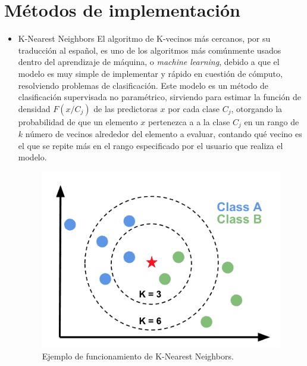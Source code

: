 \documentclass[spanish,12pt,letterpaper]{article}
\begin{document}
\section{Métodos de implementación}
\begin{itemize}
    \item K-Nearest Neighbors
    El algoritmo de K-vecinos más cercanos, por su traducción al español, es uno de los algoritmos más comúnmente usados dentro del aprendizaje de máquina, o \textit{machine learning}, debido a que el modelo es muy simple de implementar y rápido en cuestión de cómputo, resolviendo problemas de clasificación. Este modelo es un método de clasificación supervisada no paramétrico, sirviendo para estimar la función de densidad $F(x/C_j)$ de las predictoras $x$ por cada clase $C_j$, otorgando la probabilidad de que un elemento $x$ pertenezca a a la clase $C_j$ en un rango de $k$ número de vecinos alrededor del elemento a evaluar, contando qué vecino es el que se repite más en el rango especificado por el usuario que realiza el modelo.
    \begin{figure}[H]
        \centering
        \includegraphics[width=1\columnwidth]{kNN_Neighbors.png}
        \caption{Ejemplo de funcionamiento de K-Nearest Neighbors.}
        \label{fig:comand}%
    \end{figure}
    

\end{itemize}
\end{document}
